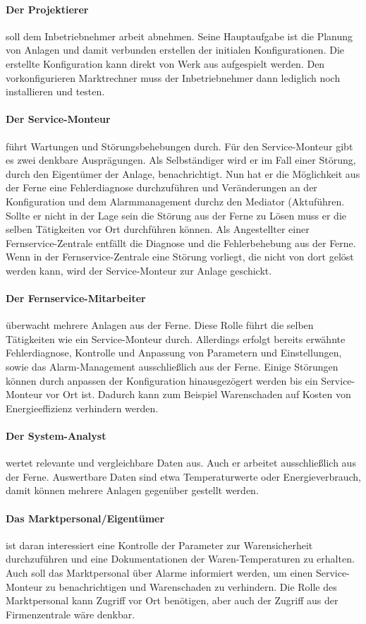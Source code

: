\documentclass[11pt,a4paper]{report}
\begin{document}
\paragraph{Der Projektierer} soll dem Inbetriebnehmer arbeit abnehmen. Seine Hauptaufgabe ist die Planung von Anlagen und damit verbunden erstellen der initialen Konfigurationen. Die erstellte Konfiguration kann direkt von Werk aus aufgespielt werden. Den vorkonfigurieren Marktrechner muss der Inbetriebnehmer dann lediglich noch installieren und testen.
\paragraph{Der Service-Monteur} führt Wartungen und Störungsbehebungen durch. Für den Service-Monteur gibt es zwei denkbare Ausprägungen. Als Selbständiger wird er im Fall einer Störung, durch den Eigentümer der Anlage, benachrichtigt. Nun hat er die Möglichkeit aus der Ferne eine Fehlerdiagnose durchzuführen und Veränderungen an der Konfiguration und dem Alarmmanagement durchz den Mediator (Aktuführen. Sollte er nicht in der Lage sein die Störung aus der Ferne zu Lösen muss er die selben Tätigkeiten vor Ort durchführen können. Als Angestellter einer Fernservice-Zentrale entfällt die Diagnose und die Fehlerbehebung aus der Ferne. Wenn in der Fernservice-Zentrale eine Störung vorliegt, die nicht von dort gelöst werden kann, wird der Service-Monteur zur Anlage geschickt.
\paragraph{Der Fernservice-Mitarbeiter} überwacht mehrere Anlagen aus der Ferne. Diese Rolle führt die selben Tätigkeiten wie ein Service-Monteur durch. Allerdings erfolgt bereits erwähnte Fehlerdiagnose, Kontrolle und Anpassung von Parametern und Einstellungen, sowie das Alarm-Management ausschließlich aus der Ferne. Einige Störungen können durch anpassen der Konfiguration hinausgezögert werden bis ein Service-Monteur vor Ort ist. Dadurch kann zum Beispiel Warenschaden auf Kosten von Energieeffizienz verhindern werden.
\paragraph{Der System-Analyst} wertet relevante und vergleichbare Daten aus. Auch er arbeitet ausschließlich aus der Ferne. Auswertbare Daten sind etwa Temperaturwerte oder Energieverbrauch, damit können mehrere Anlagen gegenüber gestellt werden. 
\paragraph{Das Marktpersonal/Eigentümer} ist daran interessiert eine Kontrolle der Parameter zur Warensicherheit durchzuführen und eine Dokumentationen der Waren-Temperaturen zu erhalten. Auch soll das Marktpersonal über Alarme informiert werden, um einen Service-Monteur zu benachrichtigen und Warenschaden zu verhindern. Die Rolle des Marktpersonal kann Zugriff vor Ort benötigen, aber auch der Zugriff aus der Firmenzentrale wäre denkbar.
\end{document}

